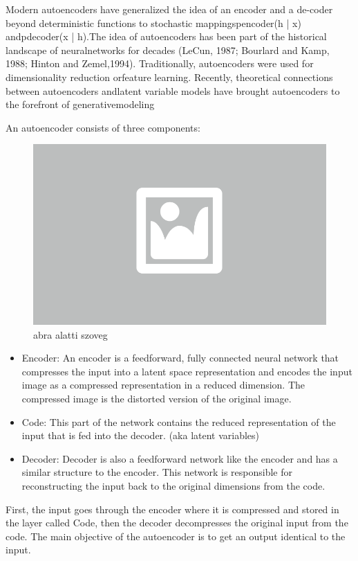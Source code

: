 Modern autoencoders have generalized the idea of an encoder and a de-coder beyond deterministic functions to stochastic mappingspencoder(h | x) andpdecoder(x | h).The idea of autoencoders has been part of the historical landscape of neuralnetworks for decades (LeCun, 1987; Bourlard and Kamp, 1988; Hinton and Zemel,1994). Traditionally, autoencoders were used for dimensionality reduction orfeature learning. Recently, theoretical connections between autoencoders andlatent variable models have brought autoencoders to the forefront of generativemodeling

An autoencoder consists of three components:

\begin{figure}[ht]
	\centering
	\includegraphics[width=0.65\columnwidth]{figures/abra.png}
	\caption{abra alatti szoveg}
\end{figure}

\begin{itemize}
	\item Encoder: An encoder is a feedforward, fully connected neural network that compresses the input into a latent space representation and encodes the input image as a compressed representation in a reduced dimension. The compressed image is the distorted version of the original image.
	\item Code: This part of the network contains the reduced representation of the input that is fed into the decoder. (aka latent variables)
	\item Decoder: Decoder is also a feedforward network like the encoder and has a similar structure to the encoder. This network is responsible for reconstructing the input back to the original dimensions from the code.
\end{itemize}

First, the input goes through the encoder where it is compressed and stored in the layer called Code, then the decoder decompresses the original input from the code. The main objective of the autoencoder is to get an output identical to the input.

